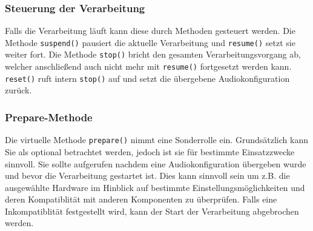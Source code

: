 \subsubsection{Steuerung der Verarbeitung}
Falls die Verarbeitung läuft kann diese durch Methoden gesteuert werden. Die Methode \texttt{suspend()} pausiert die aktuelle Verarbeitung und \texttt{resume()} setzt sie weiter fort. Die Methode \texttt{stop()} bricht den gesamten Verarbeitungsvorgang ab, welcher anschließend auch nicht mehr mit \texttt{resume()} fortgesetzt werden kann. \texttt{reset()} ruft intern \texttt{stop()} auf und setzt die übergebene Audiokonfiguration zurück.

\subsubsection{Prepare-Methode}
Die virtuelle Methode \texttt{prepare()} nimmt eine Sonderrolle ein. Grundsätzlich kann Sie als optional betrachtet werden, jedoch ist sie für bestimmte Einsatzzwecke sinnvoll. Sie sollte aufgerufen nachdem eine Audiokonfiguration übergeben wurde und bevor die Verarbeitung gestartet ist. Dies kann sinnvoll sein um z.B. die ausgewählte Hardware im Hinblick auf bestimmte Einstellungsmöglichkeiten und deren Kompatiblität mit anderen Komponenten zu überprüfen. Falls eine Inkompatiblität festgestellt wird, kann der Start der Verarbeitung abgebrochen werden.

\FloatBarrier
